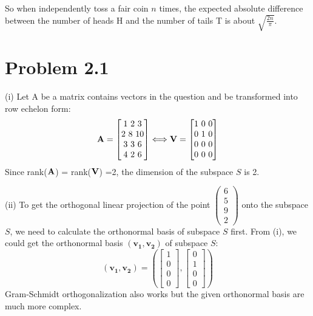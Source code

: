 \documentclass[twoside,11pt]{homework}
\begin{document}
So when independently toss a fair coin $n$ times, the expected absolute difference between the number of heads H and the number of tails T is about $\sqrt{\frac{2n}{\pi}} $.

\newpage
\section*{Problem 2.1}
(i) Let A be a matrix contains vectors in the question and be transformed into row echelon form: 
%
\begin{equation}
\bf{A} = \left[ \begin{matrix} 1\ 2\ 3 \\ 2\ 8\ 10 \\ 3\ 3\ 6 \\ 4\ 2\ 6 \end{matrix} \right] 
\Longleftrightarrow \mathbf{V} = \left[ \begin{matrix} 1\ 0\ 0 \\ 0\ 1\ 0 \\ 0\ 0\ 0 \\ 0\ 0\ 0 \end{matrix} \right] 
\end{equation}
%
Since rank($\bf{A}$) = rank($\bf{V}$) =2, the dimension of the subspace $S$ is 2.
\vspace{3 mm}

\noindent(ii) To get the orthogonal linear projection of the point $\left(\begin{smallmatrix} 6\\5\\9\\2 \end{smallmatrix} \right)$ onto the subspace $S$, we need to calculate the orthonormal basis of subspace $S$ first.
From (i), we could get the orthonormal basis $( \mathbf{v_1, v_2}) $ of subspace $S$:
%
\begin{equation}
 ( \mathbf{v_1, v_2}) = \left(\left[\begin{matrix} 1\\0 \\0 \\0 \end{matrix}\right],  \left[\begin{matrix} 0\\1 \\ 0 \\ 0\end{matrix}\right] \right)
\end{equation}
%
Gram-Schmidt orthogonalization also works but the given orthonormal basis are much more complex.
\end{document}
